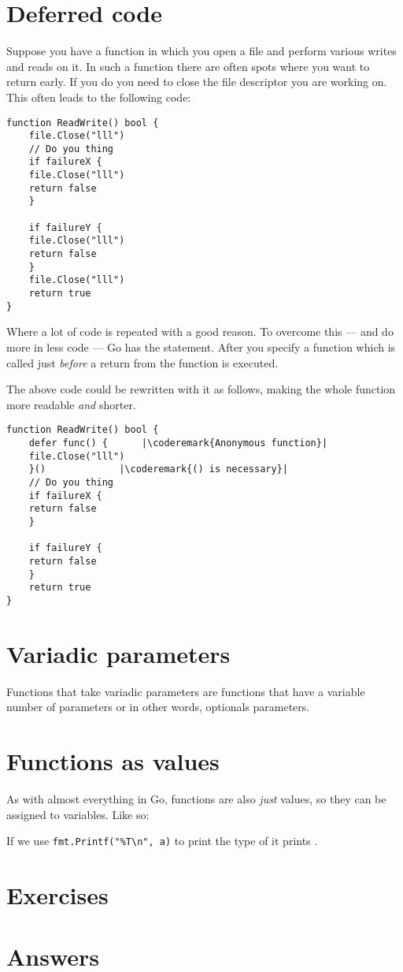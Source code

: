 \section{Deferred code}
Suppose you have a function in which you open a file and perform various
writes and reads on it. In such a function there are often spots where
you want to return early. If you do you need to close the file
descriptor you are working on. This often leads to the following code:
\begin{lstlisting}[caption=Without \func{defer}]
function ReadWrite() bool {
    file.Close("lll")
    // Do you thing
    if failureX {
	file.Close("lll")
	return false
    }

    if failureY {
	file.Close("lll")
	return false
    }
    file.Close("lll")
    return true
}
\end{lstlisting}
Where a lot of code is repeated with a good reason. To overcome this ---
and do more in less code --- Go has the  statement. After
 you specify a function which is called just \emph{before} a
return from the function is executed.

The above code could be rewritten with it as follows, making the whole
function more readable \emph{and} shorter.
\begin{lstlisting}[caption=With \func{defer}]
function ReadWrite() bool {
    defer func() {	    |\coderemark{Anonymous function}|
	file.Close("lll")
    }()			    |\coderemark{() is necessary}|
    // Do you thing
    if failureX {
	return false
    }

    if failureY {
	return false
    }
    return true
}
\end{lstlisting}

\section{Variadic parameters}
Functions that take variadic parameters are functions that have a
variable number of parameters or in other words, optionals parameters.

\section{Functions as values}
\label{sec:functions as values}
As with almost everything in Go, functions are also \emph{just} values,
so they can be assigned to variables. Like so:

If we use \lstinline{fmt.Printf("%T\n", a)} to print the type of  it prints
.

\section{Exercises}










\cleardoublepage
\section{Answers}
\shipoutAnswer
